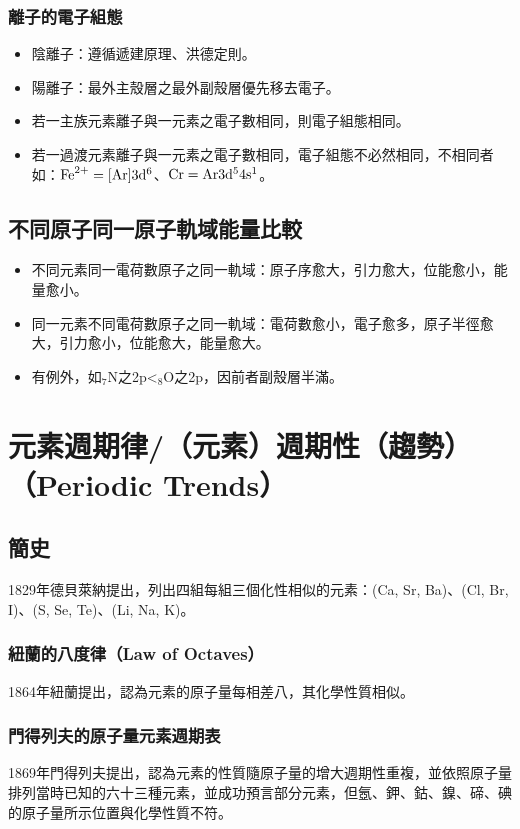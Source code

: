 \documentclass[a4paper,12pt]{report}
\begin{document}
\subsubsection{離子的電子組態}
\begin{itemize}
\item 陰離子：遵循遞建原理、洪德定則。
\item 陽離子：最外主殼層之最外副殼層優先移去電子。 
\item 若一主族元素離子與一元素之電子數相同，則電子組態相同。 
\item 若一過渡元素離子與一元素之電子數相同，電子組態不必然相同，不相同者如：$\rm{Fe}^{2+}=[\rm{Ar}]3d^6$、$\rm{Cr}=\rm{Ar}3d^54s^1$。
\end{itemize}
\subsection{不同原子同一原子軌域能量比較}
\begin{itemize}
\item 不同元素同一電荷數原子之同一軌域：原子序愈大，引力愈大，位能愈小，能量愈小。
\item 同一元素不同電荷數原子之同一軌域：電荷數愈小，電子愈多，原子半徑愈大，引力愈小，位能愈大，能量愈大。
\item 有例外，如$_7$N之2p<$_8$O之2p，因前者副殼層半滿。
\end{itemize}


\section{元素週期律/（元素）週期性（趨勢）（Periodic Trends）}
\subsection{簡史}
1829年德貝萊納提出，列出四組每組三個化性相似的元素：(Ca, Sr, Ba)、(Cl, Br, I)、(S, Se, Te)、(Li, Na, K)。
\subsubsection{紐蘭的八度律（Law of Octaves）}
1864年紐蘭提出，認為元素的原子量每相差八，其化學性質相似。
\subsubsection{門得列夫的原子量元素週期表}
1869年門得列夫提出，認為元素的性質隨原子量的增大週期性重複，並依照原子量排列當時已知的六十三種元素，並成功預言部分元素，但氬、鉀、鈷、鎳、碲、碘的原子量所示位置與化學性質不符。
\end{document}
